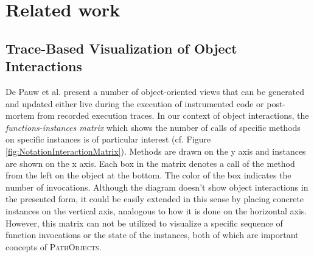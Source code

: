 \chapter{Related work}
\label{c:relatedwork}


\section[Trace-Based Visualization of Object Interactions]{Trace-Based Visualization of Object Interactions%
}

De Pauw et al. present a number of object-oriented views \cite{de_pauw_visualizing_1993, tokoro_modeling_1994} that can be generated and updated either live during the execution of instrumented code or post-mortem from recorded execution traces.
In our context of object interactions, the \emph{functions-instances matrix} which shows the number of calls of specific methods on specific instances is of particular interest (cf. Figure \ref{fig:NotationInteractionMatrix}).
Methods are drawn on the y axis and instances are shown on the x axis.
Each box in the matrix denotes a call of the method from the left on the object at the bottom.
The color of the box indicates the number of invocations.
Although the diagram doesn't show object interactions in the presented form, it could be easily extended in this sense by placing concrete instances on the vertical axis, analogous to how it is done on the horizontal axis.
However, this matrix can not be utilized to visualize a specific sequence of function invocations or the state of the instances, both of which are important concepts of \textsc{PathObjects}.

